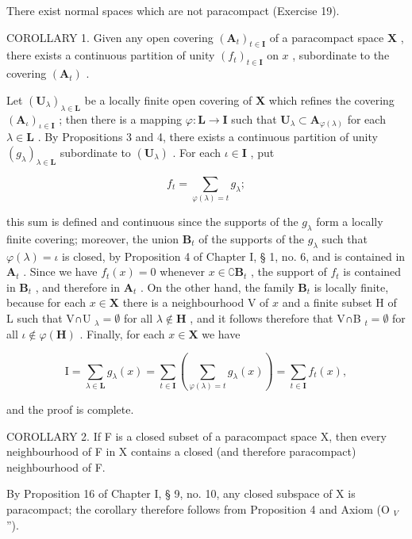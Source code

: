 There exist normal spaces which are not paracompact (Exercise 19).

COROLLARY 1. Given any open covering \((\mathbf{A}_t)_{t \in \mathbf{I}}\) of a paracompact space \(\mathbf{X}\) , there exists a continuous partition of unity \((f_t)_{t \in \mathbf{I}}\) on \(x\) , subordinate to the covering \((\mathbf{A}_t)\) .

Let \((\mathbf{U}_{\lambda})_{\lambda \in \mathbf{L}}\) be a locally finite open covering of \(\mathbf{X}\) which refines the covering \((\mathbf{A}_{\iota})_{\iota \in \mathbf{I}}\) ; then there is a mapping \(\varphi : \mathbf{L} \to \mathbf{I}\) such that \(\mathbf{U}_{\lambda} \subset \mathbf{A}_{\varphi(\lambda)}\) for each \(\lambda \in \mathbf{L}\) . By Propositions 3 and 4, there exists a continuous partition of unity \((g_{\lambda})_{\lambda \in \mathbf{L}}\) subordinate to \((\mathbf{U}_{\lambda})\) . For each \(\iota \in \mathbf{I}\) , put

\[
f _ {t} = \sum_ {\varphi (\lambda) = t} g _ {\lambda};
\]

this sum is defined and continuous since the supports of the \(g_{\lambda}\) form a locally finite covering; moreover, the union \(\mathbf{B}_{t}\) of the supports of the \(g_{\lambda}\) such that \(\varphi(\lambda)=\iota\) is closed, by Proposition 4 of Chapter I, § 1, no. 6, and is contained in \(\mathbf{A}_{t}\) . Since we have \(f_{t}(x)=0\) whenever \(x\in\complement\mathbf{B}_{t}\) , the support of \(f_{t}\) is contained in \(\mathbf{B}_{t}\) , and therefore in \(\mathbf{A}_{t}\) . On the other hand, the family \(\mathbf{B}_{t}\) is locally finite, because for each \(x\in\mathbf{X}\) there is a neighbourhood V of \(x\) and a finite subset H of L such that V∩U \(_{\lambda}=\emptyset\) for all \(\lambda\notin\mathbf{H}\) , and it follows therefore that V∩B \(_{t}=\emptyset\) for all \(\iota\notin\varphi(\mathbf{H})\) . Finally, for each \(x\in\mathbf{X}\) we have

\[
\mathrm{I} = \sum_ {\lambda \in \mathbf {L}} g _ {\lambda} (x) = \sum_ {t \in \mathbf {I}} \left(\sum_ {\varphi (\lambda) = t} g _ {\lambda} (x)\right) = \sum_ {t \in \mathbf {I}} f _ {t} (x),
\]

and the proof is complete.

COROLLARY 2. If F is a closed subset of a paracompact space X, then every neighbourhood of F in X contains a closed (and therefore paracompact) neighbourhood of F.

By Proposition 16 of Chapter I, § 9, no. 10, any closed subspace of X is paracompact; the corollary therefore follows from Proposition 4 and Axiom (O \(_{V}\) '').
\relax{}
